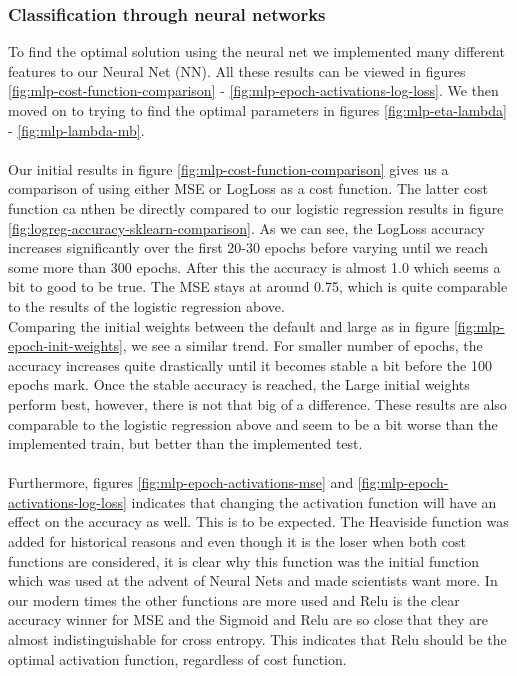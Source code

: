 \documentclass[11pt]{article}
\begin{document}
\subsubsection{Classification through neural networks}
To find the optimal solution using the neural net we implemented many different features to our Neural Net (NN). All these results can be viewed in figures \ref{fig:mlp-cost-function-comparison} - \ref{fig:mlp-epoch-activations-log-loss}. We then moved on to trying to find the optimal parameters in figures \ref{fig:mlp-eta-lambda} - \ref{fig:mlp-lambda-mb}. \\ \\
Our initial results in figure \ref{fig:mlp-cost-function-comparison} gives us a comparison of using either MSE or LogLoss as a cost function. The latter cost function ca nthen be directly compared to our logistic regression results in figure \ref{fig:logreg-accuracy-sklearn-comparison}. As we can see, the LogLoss accuracy increases significantly over the first 20-30 epochs before varying until we reach some more than 300 epochs. After this the accuracy is almost 1.0 which seems a bit to good to be true. The MSE stays at around 0.75, which is quite comparable to the results of the logistic regression above. \\
Comparing the initial weights between the default and large as in figure \ref{fig:mlp-epoch-init-weights}, we see a similar trend. For smaller number of epochs, the accuracy increases quite drastically until it becomes stable a bit before the 100 epochs mark. Once the stable accuracy is reached, the Large initial weights perform best, however, there is not that big of a difference. These results are also comparable to the logistic regression above and seem to be a bit worse than the implemented train, but better than the implemented test. \\ \\
Furthermore, figures \ref{fig:mlp-epoch-activations-mse} and \ref{fig:mlp-epoch-activations-log-loss} indicates that changing the activation function will have an effect on the accuracy as well. This is to be expected. The Heaviside function was added for historical reasons and even though it is the loser when both cost functions are considered, it is clear why this function was the initial function which was used at the advent of Neural Nets and made scientists want more. In our modern times the other functions are more used and Relu is the clear accuracy winner for MSE and the Sigmoid and Relu are so close that they are almost indistinguishable for cross entropy. This indicates that Relu should be the optimal activation function, regardless of cost function. \\
\end{document}
